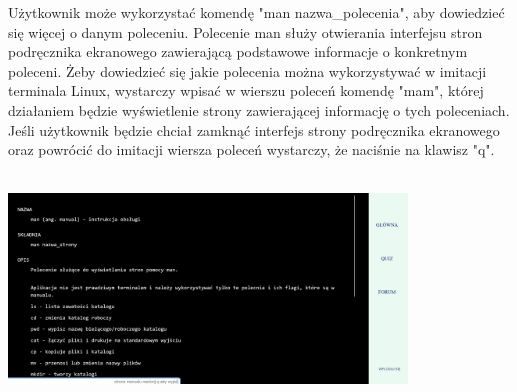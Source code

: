 \documentclass[10pt,a4paper]{report}
\begin{document}
\begin{adjustwidth}{2cm}{2cm}
\begin{minipage}{\linewidth}
\begin{center}
\end{center}
\end{minipage}
\begin{minipage}{1\linewidth}
\vspace{0.3cm}
Użytkownik może wykorzystać komendę "man nazwa\_polecenia", aby dowiedzieć się więcej o danym poleceniu. Polecenie man służy otwierania interfejsu stron podręcznika ekranowego zawierającą podstawowe informacje o konkretnym poleceni.
Żeby dowiedzieć się jakie polecenia można wykorzystywać w imitacji terminala Linux, wystarczy wpisać w wierszu poleceń komendę "mam", której działaniem będzie wyświetlenie strony zawierającej informację o tych poleceniach. Jeśli użytkownik będzie chciał zamknąć interfejs strony podręcznika ekranowego oraz powrócić do imitacji wiersza poleceń wystarczy, że naciśnie na klawisz "q".\\ \\
\end{minipage}
\begin{minipage}{\linewidth}
\begin{center}
  \includegraphics[width=400px]{project/man.png}
\end{center}
\end{minipage}

\end{adjustwidth}
\end{document}
